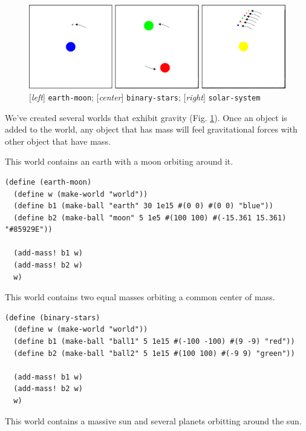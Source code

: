 \documentclass{article}
\begin{document}
\begin{figure}[h!]
  \centering
  \includegraphics[width=\textwidth,height=\textheight,keepaspectratio]
    {figs/gravity.png}
  \caption{[\textit{left}] \texttt{earth-moon}; [\textit{center}]
    \texttt{binary-stars}; [\textit{right}] \texttt{solar-system}}
  \label{figure:gravity}
\end{figure}

We've created several worlds that exhibit gravity (Fig. \ref{figure:gravity}).
Once an object is added to the world, any object that has mass will feel
gravitational forces with other object that have mass.

This world contains an earth with a moon orbiting around it.
{\small\begin{verbatim}
(define (earth-moon)
  (define w (make-world "world"))
  (define b1 (make-ball "earth" 30 1e15 #(0 0) #(0 0) "blue"))
  (define b2 (make-ball "moon" 5 1e5 #(100 100) #(-15.361 15.361) "#85929E"))

  (add-mass! b1 w)
  (add-mass! b2 w)
  w)
\end{verbatim}}


This world contains two equal masses orbiting a common center of mass.

{\small\begin{verbatim}
(define (binary-stars)
  (define w (make-world "world"))
  (define b1 (make-ball "ball1" 5 1e15 #(-100 -100) #(9 -9) "red"))
  (define b2 (make-ball "ball2" 5 1e15 #(100 100) #(-9 9) "green"))

  (add-mass! b1 w)
  (add-mass! b2 w)
  w)
\end{verbatim}}


This world contains a massive sun and several planets orbitting around the sun.
\end{document}
